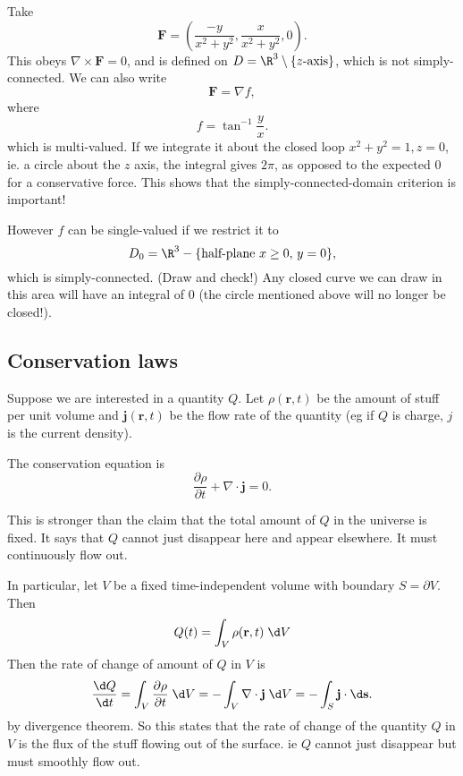 \documentclass[a4paper]{article}
\begin{document}
\begin{eg}
  Take
  \[
    \mathbf{F} = \left(\frac{- y}{x^2 + y^2}, \frac{x}{x^2 + y^2}, 0\right).
  \]
  This obeys $\nabla\times \mathbf{F} = 0$, and is defined on $D = \R^3 \setminus \{z\text{-axis}\}$, which is not simply-connected. We can also write
  \[
    \mathbf{F} = \nabla f,
  \]
  where
  \[
    f  = \tan^{-1}\frac{y}{x}.
  \]
  which is multi-valued. If we integrate it about the closed loop $x^2 + y^2 = 1, z = 0$, ie. a circle about the $z$ axis, the integral gives $2\pi$, as opposed to the expected $0$ for a conservative force. This shows that the simply-connected-domain criterion is important!

  However $f$ can be single-valued if we restrict it to
  \[
    D_0 = \R^3 - \{\text{half-plane }x \geq 0,\, y = 0\},
  \]
  which is simply-connected. (Draw and check!) Any closed curve we can draw in this area will have an integral of $0$ (the circle mentioned above will no longer be closed!).
\end{eg}

\subsection{Conservation laws}
\begin{defi}
  Suppose we are interested in a quantity $Q$. Let $\rho(\mathbf{r}, t)$ be the amount of stuff per unit volume and $\mathbf{j}(\mathbf{r}, t)$ be the flow rate of the quantity (eg if $Q$ is charge, $j$ is the current density).

  The conservation equation is
  \[
    \frac{\partial \rho}{\partial t} + \nabla\cdot \mathbf{j} = 0.
  \]
\end{defi}
This is stronger than the claim that the total amount of $Q$ in the universe is fixed. It says that $Q$ cannot just disappear here and appear elsewhere. It must continuously flow out.

In particular, let $V$ be a fixed time-independent volume with boundary $S = \partial V$. Then
\[
  Q(t) = \int_V \rho (\mathbf{r}, t)\; \d V
\]
Then the rate of change of amount of $Q$ in $V$ is
\[
  \frac{\d Q}{\d t} = \int_V \frac{\partial \rho }{\partial t}\;\d V = -\int_V \nabla \cdot \mathbf{j}\;\d V = -\int_S \mathbf{j}\cdot \d \mathbf{s}.
\]
by divergence theorem. So this states that the rate of change of the quantity $Q$ in $V$ is the flux of the stuff flowing out of the surface. ie $Q$ cannot just disappear but must smoothly flow out.
\end{document}
